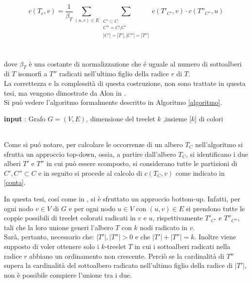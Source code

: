 \begin{equation}\label{conta}
	c(T_c,v)=\frac{1}{\beta_T}\sum_{(u,v)\in E}\sum_{\substack{C' \subset C \\C'' = C \setminus C' \\ |C'|=|T'|, |C''| = |T''|}}c(T'_{C'},v)\cdot c(T''_{C''},u)
\end{equation}\mbox{}\\\\
dove $ \beta_T $ \`e una costante di normalizzazione che \'e uguale al numero di sottoalberi di $ T $ isomorfi a $ T'' $ radicati nell'ultimo figlio della radice $ r $ di $ T $.\\
 La correttezza e la complessit\`a di questa costruzione, non sono trattate in questa tesi, ma vengono dimostrate da Alon in \cite{alon1995color}.\\
 Si pu\`o vedere l'algoritmo formalmente  descritto in Algoritmo \ref{algoritmo}.\mbox{}\\


\begin{algorithm}[H]
	\label{algoritmo}
	\SetAlgoLined
	\caption{Fase di costruzione}
 	\textbf{input} : Grafo $ G =(V,E) $, dimensione del treelet $ k $ ,insieme [$ k $] di colori\;	
 			
\end{algorithm}\mbox{}\\

Come si pu\'o notare, per calcolare le occorrenze di un albero $ T_C $ nell'algoritmo si sfrutta un approccio top-down, ossia, a partire dall'albero $ T_C $, si identificano i due alberi $ T' $ e $ T'' $ in cui pu\`o essere scomposto, si considerano tutte le partizioni di $ C',C'' \subset C $ e in seguito si procede al calcolo di $ c(T_C,v) $ come indicato in \eqref{conta}.

In questa tesi, cos\'i come in \cite{bressan2019motivo}, si \`e sfruttato un approccio bottom-up. Infatti, per ogni nodo $ v \in V $ di $ G $ e per ogni nodo $ u \in V$ con $ (u,v)\in E $ si prendono tutte le coppie possibili di treelet colorati radicati  in $ v $ e $ u $, rispettivamente $ T'_{C'} $ e $ T''_{C''} $, tali che la loro unione generi l'albero $ T $ con $ k $ nodi radicato in $ v $.\\
Sar\`a, pertanto, necessario che: $ |T'|,|T''|>0 $ e che $ |T'| + |T''| = k $.
Inoltre viene supposto di voler ottenere solo i $ k $-treelet $ T $ in cui i sottoalberi radicati nella radice $ r $ abbiano un ordinamento non crescente.
Perci\`o se la cardinalit\`a di $ T'' $ supera la cardinalit\`a del sottoalbero radicato nell'ultimo figlio della radice di $ |T'| $, non \`e possibile compiere l'unione tra i due.

